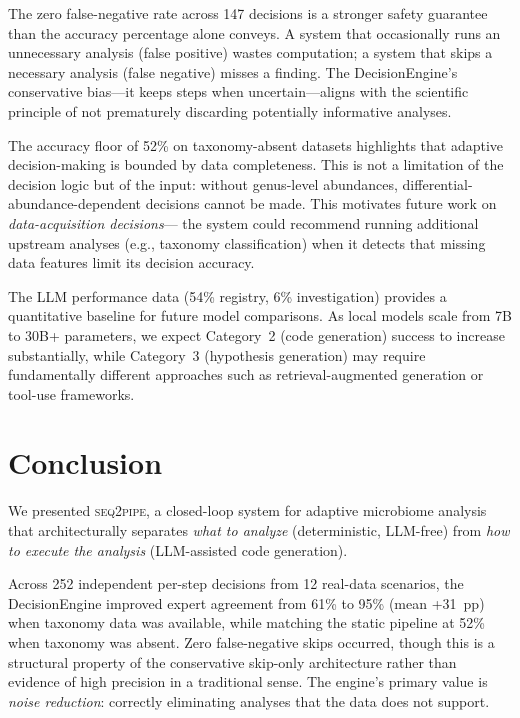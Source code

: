 \documentclass[11pt,a4paper]{article}
\newcommand{\seqpipe}{\textsc{seq2pipe}}
\begin{document}
The zero false-negative rate across 147 decisions is a stronger
safety guarantee than the accuracy percentage alone conveys.
A system that occasionally runs an unnecessary analysis
(false positive) wastes computation; a system that skips a
necessary analysis (false negative) misses a finding.
The DecisionEngine's conservative bias---it keeps steps when
uncertain---aligns with the scientific principle of not prematurely
discarding potentially informative analyses.

The accuracy floor of 52\% on taxonomy-absent datasets highlights
that adaptive decision-making is bounded by data completeness.
This is not a limitation of the decision logic but of the input:
without genus-level abundances, differential-abundance-dependent
decisions cannot be made.
This motivates future work on \textit{data-acquisition decisions}---
the system could recommend running additional upstream analyses
(e.g., taxonomy classification) when it detects that missing data
features limit its decision accuracy.

The LLM performance data (54\% registry, 6\% investigation)
provides a quantitative baseline for future model comparisons.
As local models scale from 7B to 30B+ parameters, we expect
Category~2 (code generation) success to increase substantially,
while Category~3 (hypothesis generation) may require fundamentally
different approaches such as retrieval-augmented generation or
tool-use frameworks.

\section{Conclusion}
\label{sec:conclusion}

We presented \seqpipe, a closed-loop system for adaptive microbiome
analysis that architecturally separates \textit{what to analyze}
(deterministic, LLM-free) from \textit{how to execute the analysis}
(LLM-assisted code generation).

Across 252 independent per-step decisions from 12 real-data
scenarios, the DecisionEngine improved expert agreement from 61\%
to 95\% (mean +31~pp) when taxonomy data was available, while
matching the static pipeline at 52\% when taxonomy was absent.
Zero false-negative skips occurred, though this is a structural
property of the conservative skip-only architecture rather than
evidence of high precision in a traditional sense.
The engine's primary value is \textit{noise reduction}: correctly
eliminating analyses that the data does not support.
\end{document}
